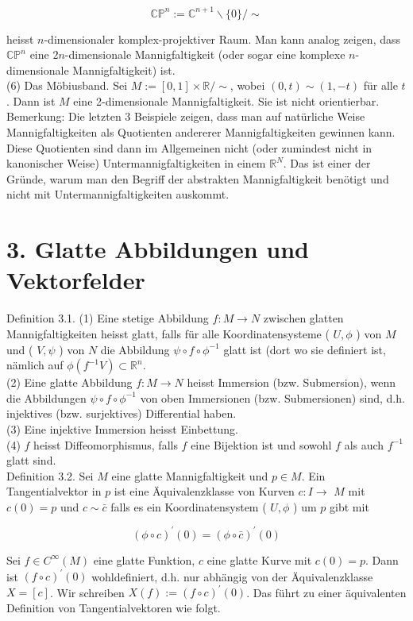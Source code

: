 \documentclass[10pt, letterpaper]{article}
\begin{document}
$$
\mathbb{C P}^{n}:=\mathbb{C}^{n+1} \backslash\{0\} / \sim
$$

heisst $n$-dimensionaler komplex-projektiver Raum. Man kann analog zeigen, dass $\mathbb{C P}^{n}$ eine $2 n$-dimensionale Mannigfaltigkeit (oder sogar eine komplexe $n$-dimensionale Mannigfaltigkeit) ist.\\
(6) Das Möbiusband. Sei $M:=[0,1] \times \mathbb{R} / \sim$, wobei $(0, t) \sim(1,-t)$ für alle $t$. Dann ist $M$ eine 2-dimensionale Mannigfaltigkeit. Sie ist nicht orientierbar.\\
Bemerkung: Die letzten 3 Beispiele zeigen, dass man auf natürliche Weise Mannigfaltigkeiten als Quotienten andererer Mannigfaltigkeiten gewinnen kann. Diese Quotienten sind dann im Allgemeinen nicht (oder zumindest nicht in kanonischer Weise) Untermannigfaltigkeiten in einem $\mathbb{R}^{N}$. Das ist einer der Gründe, warum man den Begriff der abstrakten Mannigfaltigkeit benötigt und nicht mit Untermannigfaltigkeiten auskommt.

\section*{3. Glatte Abbildungen und Vektorfelder}
Definition 3.1. (1) Eine stetige Abbildung $f: M \rightarrow N$ zwischen glatten Mannigfaltigkeiten heisst glatt, falls für alle Koordinatensysteme ( $U, \phi$ ) von $M$ und ( $V, \psi$ ) von $N$ die Abbildung $\psi \circ f \circ \phi^{-1}$ glatt ist (dort wo sie definiert ist, nämlich auf $\phi\left(f^{-1} V\right) \subset \mathbb{R}^{n}$.\\
(2) Eine glatte Abbildung $f: M \rightarrow N$ heisst Immersion (bzw. Submersion), wenn die Abbildungen $\psi \circ f \circ \phi^{-1}$ von oben Immersionen (bzw. Submersionen) sind, d.h. injektives (bzw. surjektives) Differential haben.\\
(3) Eine injektive Immersion heisst Einbettung.\\
(4) $f$ heisst Diffeomorphismus, falls $f$ eine Bijektion ist und sowohl $f$ als auch $f^{-1}$ glatt sind.\\
Definition 3.2. Sei $M$ eine glatte Mannigfaltigkeit und $p \in M$. Ein Tangentialvektor in $p$ ist eine Äquivalenzklasse von Kurven $c: I \rightarrow$ $M$ mit $c(0)=p$ und $c \sim \bar{c}$ falls es ein Koordinatensystem ( $U, \phi$ ) um $p$ gibt mit

$$
(\phi \circ c)^{\prime}(0)=(\phi \circ \bar{c})^{\prime}(0)
$$

Sei $f \in C^{\infty}(M)$ eine glatte Funktion, $c$ eine glatte Kurve mit $c(0)=p$. Dann ist $(f \circ c)^{\prime}(0)$ wohldefiniert, d.h. nur abhängig von der Äquivalenzklasse $X=[c]$. Wir schreiben $X(f):=(f \circ c)^{\prime}(0)$. Das führt zu einer äquivalenten Definition von Tangentialvektoren wie folgt.
\end{document}
